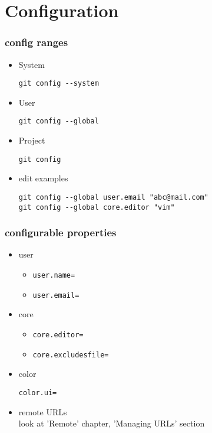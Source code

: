 \documentclass{report}
\begin{document}
\part{Configuration}


\section{config ranges}
\begin{itemize}
	\item System
	\begin{lstlisting}
git config --system
\end{lstlisting}

\item User
\begin{lstlisting}
git config --global
\end{lstlisting}

\item Project
\begin{lstlisting}
git config
\end{lstlisting}

\item edit examples
\begin{lstlisting}
git config --global user.email "abc@mail.com"
git config --global core.editor "vim"
\end{lstlisting}
\end{itemize}

\section{configurable properties}
\begin{itemize}

\item user
\begin{itemize}
\item \begin{verbatim}
user.name=
\end{verbatim}
\item \begin{verbatim}
user.email=
\end{verbatim}
\end{itemize}

\item core
\begin{itemize}
\item \begin{verbatim}
core.editor=
\end{verbatim}
\item \begin{verbatim}
core.excludesfile=
\end{verbatim}
\end{itemize}

\item color\begin{verbatim}
color.ui=
\end{verbatim}

\item remote URLs\\
look at 'Remote' chapter, 'Managing URLs' section

\end{itemize}
\end{document}
